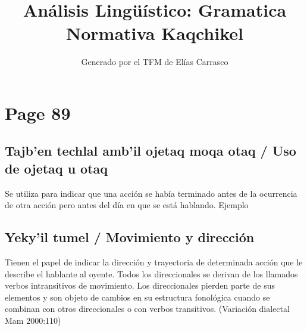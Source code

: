 \documentclass{article}%
\title{Análisis Lingüístico: Gramatica Normativa Kaqchikel}%
\author{Generado por el TFM de Elías Carrasco}%
\begin{document}
%
\normalsize%
\maketitle%
\section{Page 89}%
\label{sec:Page89}%
\subsection{Tajb’en techlal amb’il ojetaq moqa otaq / Uso de ojetaq u otaq}%
\label{subsec:Tajbentechlalambilojetaqmoqaotaq/Usodeojetaquotaq}%

%
Se utiliza para indicar que una acción se había terminado antes de la ocurrencia de otra acción pero antes del día en que se está hablando. %
Ejemplo %
\subsection{Yeky’il tumel / Movimiento y dirección}%
\label{subsec:Yekyiltumel/Movimientoydireccin}%

%
Tienen el papel de indicar la dirección y trayectoria de determinada acción que le describe el hablante al oyente. Todos los direccionales se derivan de los llamados verbos intransitivos de movimiento. Los direccionales pierden parte de sus elementos y son objeto de cambios en su estructura fonológica cuando se combinan con otros direccionales o con verbos transitivos. (Variación dialectal Mam 2000:110) 

%
\end{document}
